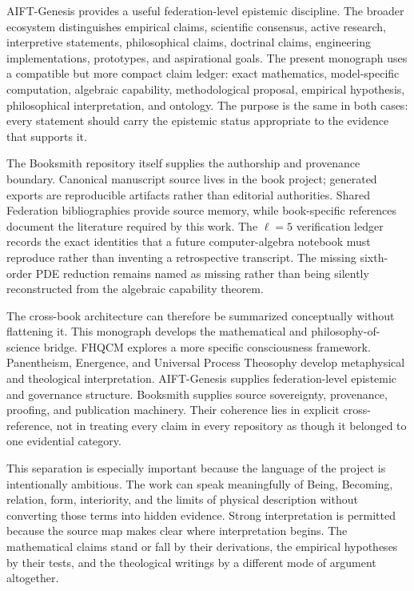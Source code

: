 AIFT-Genesis provides a useful federation-level epistemic discipline. The broader ecosystem distinguishes empirical claims, scientific consensus, active research, interpretive statements, philosophical claims, doctrinal claims, engineering implementations, prototypes, and aspirational goals. The present monograph uses a compatible but more compact claim ledger: exact mathematics, model-specific computation, algebraic capability, methodological proposal, empirical hypothesis, philosophical interpretation, and ontology. The purpose is the same in both cases: every statement should carry the epistemic status appropriate to the evidence that supports it.

The Booksmith repository itself supplies the authorship and provenance boundary. Canonical manuscript source lives in the book project; generated exports are reproducible artifacts rather than editorial authorities. Shared Federation bibliographies provide source memory, while book-specific references document the literature required by this work. The $\ell=5$ verification ledger records the exact identities that a future computer-algebra notebook must reproduce rather than inventing a retrospective transcript. The missing sixth-order PDE reduction remains named as missing rather than being silently reconstructed from the algebraic capability theorem.

The cross-book architecture can therefore be summarized conceptually without flattening it. This monograph develops the mathematical and philosophy-of-science bridge. FHQCM explores a more specific consciousness framework. Panentheism, Energence, and Universal Process Theosophy develop metaphysical and theological interpretation. AIFT-Genesis supplies federation-level epistemic and governance structure. Booksmith supplies source sovereignty, provenance, proofing, and publication machinery. Their coherence lies in explicit cross-reference, not in treating every claim in every repository as though it belonged to one evidential category.

This separation is especially important because the language of the project is intentionally ambitious. The work can speak meaningfully of Being, Becoming, relation, form, interiority, and the limits of physical description without converting those terms into hidden evidence. Strong interpretation is permitted because the source map makes clear where interpretation begins. The mathematical claims stand or fall by their derivations, the empirical hypotheses by their tests, and the theological writings by a different mode of argument altogether.
